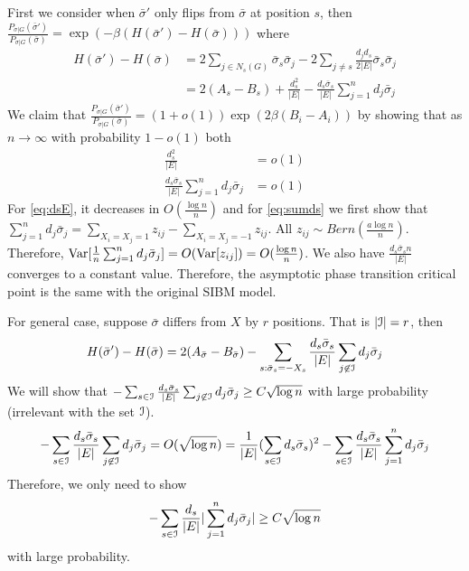 \documentclass{article}
\begin{document}
First we consider when $\bar{\sigma}'$ only flips from $\bar{\sigma}$ at position $s$, then
$\frac{P_{\sigma | G}(\bar{\sigma}')}{P_{\sigma |G}(\bar{\sigma})} = \exp(-\beta(H(\bar{\sigma}')-H(\bar{\sigma})))$
where
\begin{align*}
H(\bar{\sigma}')-H(\bar{\sigma}) &= 2\sum_{j\in N_s(G)} \bar{\sigma}_s \bar{\sigma}_j - 2\sum_{j\neq s}\frac{d_jd_s}{2|E|} \bar{\sigma}_s \bar{\sigma}_j  \\
&=2(A_s - B_s) + \frac{d_s^2}{|E|} - \frac{d_s\bar{\sigma}_s}{|E|}\sum_{j=1}^n d_j \bar{\sigma}_j
\end{align*}
We claim that $\frac{P_{\sigma | G}(\bar{\sigma}')}{P_{\sigma |G}(\bar{\sigma})} =(1+o(1))\exp(2\beta(B_i - A_i))$
by showing that as $n\to \infty$ with probability $1-o(1)$ both 
\begin{align}
\frac{d_s^2}{|E|} &= o(1) \label{eq:dsE}\\
\frac{d_s\bar{\sigma}_s}{|E|}\sum_{j=1}^n d_j \bar{\sigma}_j  &= o(1) \label{eq:sumds}
\end{align}
For \eqref{eq:dsE}, it decreases in $O(\frac{\log n}{n})$ and for 
\eqref{eq:sumds} we first show that
$\sum_{j=1}^n d_j \bar{\sigma}_j  = \sum_{X_i=X_j=1} z_{ij} - \sum_{X_i=X_j=-1} z_{ij}$.
All $z_{ij} \sim Bern(\frac{a\log n}{n})$. Therefore,
$\operatorname{Var}[\frac{1}{n}\sum_{j=1}^n d_j \bar{\sigma}_j] = O(\operatorname{Var}[z_{ij}]) = O(\frac{ \log n}{n})$.
We also have $\frac{d_s \bar{\sigma}_s n}{|E|}$ converges to a constant value.
Therefore, the asymptotic phase transition critical point is the same with the original SIBM model.

For general case, suppose $\bar{\sigma}$ differs from $X$ by $r$ positions.
That is $|\mathcal{I}|=r$, then
$$
H(\bar{\sigma}')-H(\bar{\sigma}) = 2(A_{\bar{\sigma}} - B_{\bar{\sigma}}) - \sum_{s: \bar{\sigma}_s = -X_s} \frac{d_s \bar{\sigma}_s}{|E|}
\sum_{j \not \in \mathcal{I}} d_j \bar{\sigma}_j
$$
We will show that $-\sum_{s\in \mathcal{I}} \frac{d_s \bar{\sigma}_s}{|E|}
\sum_{j \not \in \mathcal{I}} d_j \bar{\sigma}_j \geq C \sqrt{\log n}$ with large probability (irrelevant with the set $\mathcal{I}$). %
$$
-\sum_{s\in \mathcal{I}} \frac{d_s \bar{\sigma}_s}{|E|}
\sum_{j \not \in \mathcal{I}} d_j \bar{\sigma}_j = O(\sqrt{\log n})
= \frac{1}{|E|}  (\sum_{s\in \mathcal{I}} d_s \bar{\sigma}_s)^2 - \sum_{s\in \mathcal{I}} \frac{d_s \bar{\sigma}_s}{|E|}
\sum_{j=1}^n d_j \bar{\sigma}_j 
$$
Therefore, we only need to show 
$$
 - \sum_{s\in \mathcal{I}} \frac{d_s}{|E|}
|\sum_{j=1}^n d_j \bar{\sigma}_j|  \geq C \sqrt{\log n}
$$
with large probability.
\end{document}
